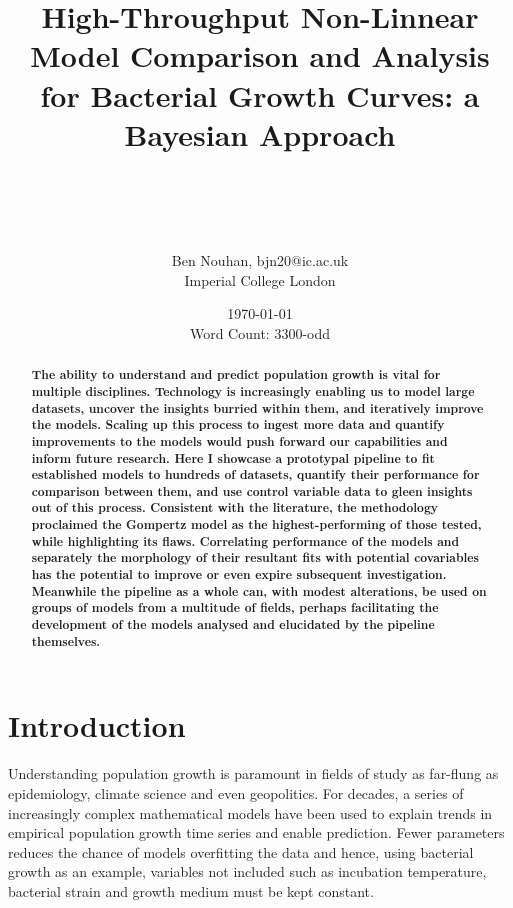 \documentclass[11pt]{article}
\title{High-Throughput Non-Linnear Model Comparison and Analysis for Bacterial Growth Curves: a Bayesian Approach}
\author{\\ \\ \\ \\ Ben Nouhan, bjn20@ic.ac.uk \\ Imperial College London \\}
\date{\today \\ Word Count: 3300-odd}
\begin{document}
\vspace{30mm} %
\maketitle
\thispagestyle{empty}

\vspace{20mm}
\onehalfspacing
\renewcommand{\abstractname}{\vspace{-\baselineskip}} %

\begin{abstract}
    \linenumbers
    \noindent
    \textbf{The ability to understand and predict population growth is vital for multiple disciplines. Technology is increasingly enabling us to model large datasets, uncover the insights burried within them, and iteratively improve the models. Scaling up this process to ingest more data and quantify improvements to the models would push forward our capabilities and inform future research. Here I showcase a prototypal pipeline to fit established models to hundreds of datasets, quantify their performance for comparison between them, and use control variable data to gleen insights out of this process. Consistent with the literature, the methodology proclaimed the Gompertz model as the highest-performing of those tested, while highlighting its flaws. Correlating performance of the models and separately the morphology of their resultant fits with potential covariables has the potential to improve or even expire subsequent investigation. Meanwhile the pipeline as a whole can, with modest alterations, be used on groups of models from a multitude of fields, perhaps facilitating the development of the models analysed and elucidated by the pipeline themselves.
    }
\end{abstract}
\vspace{10mm}


\newpage
\tableofcontents
\thispagestyle{empty}

\newpage
\linenumbers
\setcounter{page}{1}
\section{Introduction}%


Understanding population growth is paramount in fields of study as far-flung as epidemiology, climate science and even geopolitics.\parencite{Ozgul2010,Peleg1997} For decades, a series of increasingly complex mathematical models have been used to explain trends in empirical population growth time series and enable prediction.\parencite{Kingsland1982,Grijspeerdt1999,Tjørve2017} Fewer parameters reduces the chance of models overfitting the data and hence, using bacterial growth as an example, variables not included such as incubation temperature, bacterial strain and growth medium must be kept constant.
\end{document}
